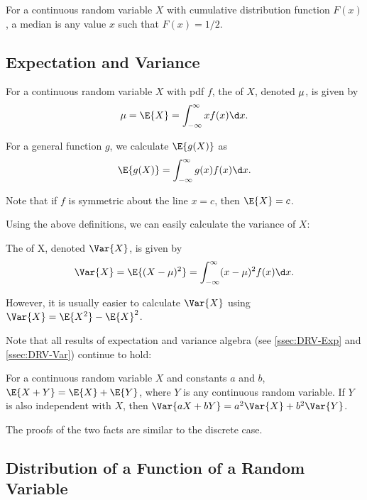\begin{definition}
    For a continuous random variable $X$ with cumulative distribution function $F(x)$, a median is any value $x$ such that $F(x) = 1/2$.
\end{definition}

\subsection{Expectation and Variance}

\begin{definition}
    For a continuous random variable $X$ with pdf $f$, the  of $X$, denoted $\mu$, is given by \[\m = \E{X} = \int_{-\infty}^{\infty} x f(x) \d x.\]

    For a general function $g$, we calculate $\E{g(X)}$ as \[\E{g(X)} = \int_{-\infty}^{\infty} g(x) f(x) \d x.\]
\end{definition}

Note that if $f$ is symmetric about the line $x = c$, then $\E{X} = c$.

Using the above definitions, we can easily calculate the variance of $X$: 

\begin{definition}
    The  of X, denoted $\Var{X}$, is given by \[\Var{X} = \E{(X-\m)^2} = \int_{-\infty}^\infty (x-\m)^2 f(x) \d x.\]
\end{definition}

However, it is usually easier to calculate $\Var{X}$ using $\Var{X} = \E{X^2} - \E{X}^2$.

Note that all results of expectation and variance algebra (see \SS\ref{ssec:DRV-Exp} and \SS\ref{ssec:DRV-Var}) continue to hold:

\begin{fact}
    For a continuous random variable $X$ and constants $a$ and $b$, $\E{X + Y} = \E{X} + \E{Y}$, where $Y$ is any continuous random variable. If $Y$ is also independent with $X$, then $\Var{aX + bY} = a^2 \Var{X} + b^2 \Var{Y}$.
\end{fact}

The proofs of the two facts are similar to the discrete case.

\subsection{Distribution of a Function of a Random Variable}

